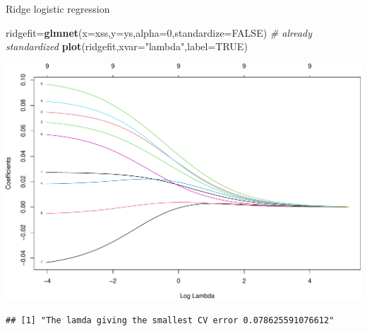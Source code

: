 \documentclass[
  ignorenonframetext,
]{beamer}
\newenvironment{Shaded}{\begin{snugshade}}{\end{snugshade}}
\newcommand{\CommentTok}[1]{\textcolor[rgb]{0.56,0.35,0.01}{\textit{#1}}}
\newcommand{\DataTypeTok}[1]{\textcolor[rgb]{0.13,0.29,0.53}{#1}}
\newcommand{\DecValTok}[1]{\textcolor[rgb]{0.00,0.00,0.81}{#1}}
\newcommand{\KeywordTok}[1]{\textcolor[rgb]{0.13,0.29,0.53}{\textbf{#1}}}
\newcommand{\NormalTok}[1]{#1}
\newcommand{\OperatorTok}[1]{\textcolor[rgb]{0.81,0.36,0.00}{\textbf{#1}}}
\newcommand{\OtherTok}[1]{\textcolor[rgb]{0.56,0.35,0.01}{#1}}
\newcommand{\StringTok}[1]{\textcolor[rgb]{0.31,0.60,0.02}{#1}}
\begin{document}
\begin{frame}[fragile]

\begin{block}{Ridge logistic regression}

\begin{Shaded}
\begin{Highlighting}[]
\NormalTok{ridgefit=}\KeywordTok{glmnet}\NormalTok{(}\DataTypeTok{x=}\NormalTok{xss,}\DataTypeTok{y=}\NormalTok{ys,}\DataTypeTok{alpha=}\DecValTok{0}\NormalTok{,}\DataTypeTok{standardize=}\OtherTok{FALSE}\NormalTok{) }\CommentTok{# already standardized}
\KeywordTok{plot}\NormalTok{(ridgefit,}\DataTypeTok{xvar=}\StringTok{"lambda"}\NormalTok{,}\DataTypeTok{label=}\OtherTok{TRUE}\NormalTok{)}
\end{Highlighting}
\end{Shaded}

\includegraphics{L3_files/figure-beamer/unnamed-chunk-7-1.pdf}

\begin{Shaded}
\end{Shaded}

\begin{verbatim}
## [1] "The lamda giving the smallest CV error 0.078625591076612"
\end{verbatim}


\end{block}
\end{frame}
\end{document}
